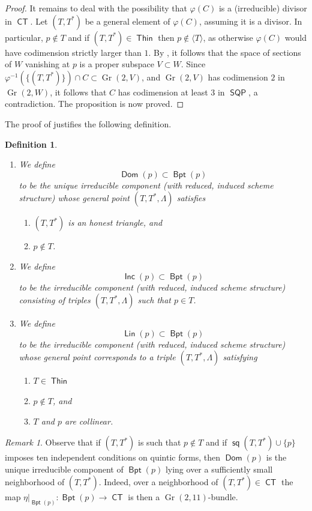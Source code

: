 \documentclass[reqno, 11pt]{amsart}
\theoremstyle{plain}
\newtheorem{definition}[theorem]{Definition}
\theoremstyle{remark}
\newtheorem{remark}[theorem]{Remark}
\DeclareMathOperator{\CT}{\mathsf{CT}}
\DeclareMathOperator{\Thin}{\mathsf{Thin}}
\DeclareMathOperator{\SQP}{\mathsf{SQP}}
\DeclareMathOperator{\Gr}{Gr}
\DeclareMathOperator{\s}{\mathsf{sq}}
\DeclareMathOperator{\BP}{\mathsf{Bpt}}
\DeclareMathOperator{\Dom}{\mathsf{Dom}}
\DeclareMathOperator{\Lin}{\mathsf{Lin}}
\DeclareMathOperator{\Inc}{\mathsf{Inc}}
\begin{document}
\begin{proof}
    It remains to deal with the possibility that $\varphi(C)$ is a (irreducible) divisor in $\CT$. Let $(T,T^{*})$ be a general element of $\varphi(C)$, assuming it is a divisor. In particular, $p \notin T$ and if $(T,T^{*}) \in \Thin$ then $p \notin \langle T \rangle$, as otherwise $\varphi(C)$ would have codimension strictly larger than $1$.  By , it follows that the space of sections of $W$ vanishing at $p$ is a proper subspace $V \subset W$.  Since $\varphi^{-1}(\{(T,T^{*})\}) \cap C \subset \Gr(2,V)$, and $\Gr(2,V)$ has codimension $2$ in $\Gr(2,W)$, it follows that $C$ has codimension at least $3$ in $\SQP$, a contradiction.  The proposition is now proved.
\end{proof}

The proof of  justifies the following definition.

\begin{definition}
  \label{definition:D}
  \begin{enumerate}
    \item    We define \[\Dom (p) \subset \BP (p)\] to be the unique irreducible
  component (with reduced, induced scheme structure) whose general
  point $(T,T^{*},\Lambda)$ satisfies
    \begin{enumerate}
     \item $(T,T^{*})$ is an honest triangle, and
     \item $p \notin T$.
      \end{enumerate} 

    \item  We define \[ \Inc (p) \subset \BP (p) \] to be the irreducible component 
  (with reduced, induced scheme structure) consisting of triples
  $(T,T^{*},\Lambda)$ such that $p \in T$.
    \item  We define \[\Lin (p) \subset \BP (p)\] to
  be the irreducible component (with reduced, induced scheme
  structure) whose general point corresponds to a triple $(T,T^{*}, \Lambda)$ satisfying
  \begin{enumerate}
  \item $T \in \Thin$
  \item $p \notin T$, and
  \item $T$ and $p$ are collinear.
  \end{enumerate}
  \end{enumerate}
\end{definition}

\begin{remark}
    \label{remark:Dombundle} Observe that if $(T,T^{*})$ is such that $p \notin T$ and if $\s(T,T^{*}) \cup \{p\}$ imposes ten independent conditions on quintic forms, then $\Dom(p)$ is the unique irreducible component of $\BP(p)$ lying over a sufficiently small neighborhood of $(T,T^{*})$.  Indeed, over a neighborhood of $(T,T^{*}) \in \CT$ the map $\eta|_{\BP(p)}: \BP(p) \to \CT$ is then a $\Gr(2,11)$-bundle.
\end{remark}
\end{document}

